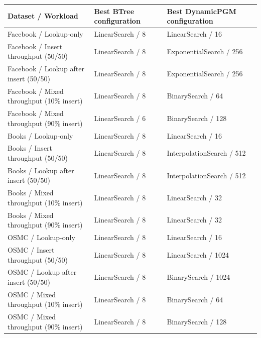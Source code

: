 \begin{tabular}{lll}
\toprule
Dataset / Workload & Best BTree configuration & Best DynamicPGM configuration \\
\midrule
Facebook / Lookup-only & LinearSearch / 8 & LinearSearch / 16 \\
Facebook / Insert throughput (50/50) & LinearSearch / 8 & ExponentialSearch / 256 \\
Facebook / Lookup after insert (50/50) & LinearSearch / 8 & ExponentialSearch / 256 \\
Facebook / Mixed throughput (10\% insert) & LinearSearch / 8 & BinarySearch / 64 \\
Facebook / Mixed throughput (90\% insert) & LinearSearch / 6 & BinarySearch / 128 \\
\midrule
Books / Lookup-only & LinearSearch / 8 & LinearSearch / 16 \\
Books / Insert throughput (50/50) & LinearSearch / 8 & InterpolationSearch / 512 \\
Books / Lookup after insert (50/50) & LinearSearch / 8 & InterpolationSearch / 512 \\
Books / Mixed throughput (10\% insert) & LinearSearch / 8 & LinearSearch / 32 \\
Books / Mixed throughput (90\% insert) & LinearSearch / 8 & LinearSearch / 32 \\
\midrule
OSMC / Lookup-only & LinearSearch / 8 & LinearSearch / 16 \\
OSMC / Insert throughput (50/50) & LinearSearch / 8 & LinearSearch / 1024 \\
OSMC / Lookup after insert (50/50) & LinearSearch / 8 & BinarySearch / 1024 \\
OSMC / Mixed throughput (10\% insert) & LinearSearch / 8 & BinarySearch / 64 \\
OSMC / Mixed throughput (90\% insert) & LinearSearch / 8 & BinarySearch / 128 \\
\bottomrule
\end{tabular}
